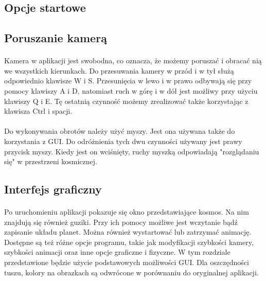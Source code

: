 \subsection{Opcje startowe}\label{sub:uruchamianie programu}
\paragraph{}

\subsection{Poruszanie kamerą}\label{sub:poruszanie kamerą}
\paragraph{}
Kamera w aplikacji jest swobodna, co oznacza, że możemy poruszać i obracać nią we wszystkich kierunkach. Do przesuwania kamery w przód i w tył służą odpowiednio klawisze W i S. Przesunięcia w lewo i w prawo odbywają się przy pomocy klawiszy A i D, natomiast ruch w górę i w dół jest możliwy przy użyciu klawiszy Q i E. Tę ostatnią czynność możemy zrealizować także korzystając z klawisza Ctrl i spacji.
\paragraph{}
Do wykonywania obrotów należy użyć myszy. Jest ona używana także do korzystania z GUI. Do odróżnienia tych dwu czynności używany jest prawy przycisk myszy. Kiedy jest on wciśnięty, ruchy myszką odpowiadają "rozglądaniu się" w przestrzeni kosmicznej. 

\subsection{Interfejs graficzny}\label{sub:interfejs graficzny}
\paragraph{}

Po uruchomieniu aplikacji pokazuje się okno przedstawiające kosmos. Na nim znajdują się również guziki. Przy ich pomocy możliwe jest wczytanie bądź zapisanie układu planet. Można również wystartować lub zatrzymać animację. Dostępne są też różne opcje programu, takie jak modyfikacji szybkości kamery, szybkości animacji oraz inne opcje graficzne i fizyczne. W tym rozdziale przedstawione będzie użycie podstawowych możliwości GUI. Dla oszczędności tuszu, kolory na obrazkach są odwrócone w porównaniu do oryginalnej aplikacji.

